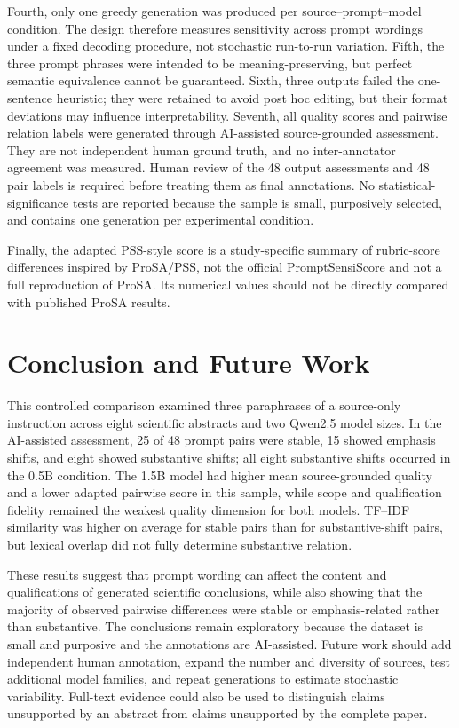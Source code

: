 \documentclass[acmsmall,screen,nonacm]{acmart}
\begin{document}
Fourth, only one greedy generation was produced per source--prompt--model condition. The design therefore measures sensitivity across prompt wordings under a fixed decoding procedure, not stochastic run-to-run variation. Fifth, the three prompt phrases were intended to be meaning-preserving, but perfect semantic equivalence cannot be guaranteed. Sixth, three outputs failed the one-sentence heuristic; they were retained to avoid post hoc editing, but their format deviations may influence interpretability. Seventh, all quality scores and pairwise relation labels were generated through AI-assisted source-grounded assessment. They are not independent human ground truth, and no inter-annotator agreement was measured. Human review of the 48 output assessments and 48 pair labels is required before treating them as final annotations. No statistical-significance tests are reported because the sample is small, purposively selected, and contains one generation per experimental condition.

Finally, the adapted PSS-style score is a study-specific summary of rubric-score differences inspired by ProSA/PSS, not the official PromptSensiScore and not a full reproduction of ProSA. Its numerical values should not be directly compared with published ProSA results.

\section{Conclusion and Future Work}
This controlled comparison examined three paraphrases of a source-only instruction across eight scientific abstracts and two Qwen2.5 model sizes. In the AI-assisted assessment, 25 of 48 prompt pairs were stable, 15 showed emphasis shifts, and eight showed substantive shifts; all eight substantive shifts occurred in the 0.5B condition. The 1.5B model had higher mean source-grounded quality and a lower adapted pairwise score in this sample, while scope and qualification fidelity remained the weakest quality dimension for both models. TF--IDF similarity was higher on average for stable pairs than for substantive-shift pairs, but lexical overlap did not fully determine substantive relation.

These results suggest that prompt wording can affect the content and qualifications of generated scientific conclusions, while also showing that the majority of observed pairwise differences were stable or emphasis-related rather than substantive. The conclusions remain exploratory because the dataset is small and purposive and the annotations are AI-assisted. Future work should add independent human annotation, expand the number and diversity of sources, test additional model families, and repeat generations to estimate stochastic variability. Full-text evidence could also be used to distinguish claims unsupported by an abstract from claims unsupported by the complete paper.
\end{document}
